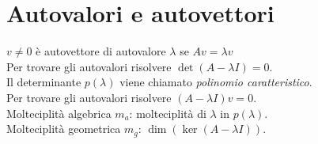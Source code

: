 \section{Autovalori e autovettori}

$v \neq 0$ è autovettore di autovalore $\lambda$ se $Av = \lambda v$ \\

Per trovare gli autovalori risolvere $\det(A-\lambda I) = 0$. \\
Il determinante $p(\lambda)$ viene chiamato \emph{polinomio caratteristico}. \\

Per trovare gli autovalori risolvere $(A-\lambda I)v=0$. \\

Molteciplità algebrica $m_a$: molteciplità di $\lambda$ in $p(\lambda)$. \\
Molteciplità geometrica $m_g$: $\dim (\ker (A-\lambda I))$. \\
